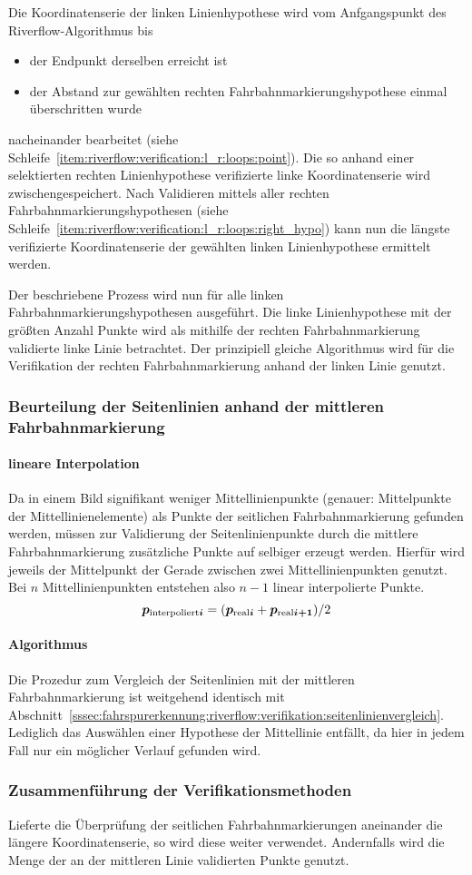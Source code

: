 Die Koordinatenserie der linken Linienhypothese wird vom Anfgangspunkt des Riverflow-Algorithmus bis
\begin{itemize}
\item der Endpunkt derselben erreicht ist 
\item der Abstand zur gewählten rechten Fahrbahnmarkierungshypothese einmal überschritten wurde
\end{itemize}
nacheinander bearbeitet (siehe Schleife~\ref{item:riverflow:verification:l_r:loops:point}). Die so anhand einer selektierten rechten Linienhypothese verifizierte linke Koordinatenserie wird zwischengespeichert. 
Nach Validieren mittels aller rechten Fahrbahnmarkierungshypothesen (siehe Schleife~\ref{item:riverflow:verification:l_r:loops:right_hypo}) kann nun die längste verifizierte Koordinatenserie der gewählten linken Linienhypothese ermittelt werden.

Der beschriebene Prozess wird nun für alle linken Fahrbahnmarkierungshypothesen ausgeführt. Die linke Linienhypothese mit der größten Anzahl Punkte wird als mithilfe der rechten Fahrbahnmarkierung validierte linke Linie betrachtet. Der prinzipiell gleiche Algorithmus wird für die Verifikation der rechten Fahrbahnmarkierung anhand der linken Linie genutzt.

\subsubsection{Beurteilung der Seitenlinien anhand der mittleren Fahrbahnmarkierung}
\paragraph{lineare Interpolation}
Da in einem Bild signifikant weniger Mittellinienpunkte (genauer: Mittelpunkte der Mittellinienelemente) als Punkte der seitlichen Fahrbahnmarkierung gefunden werden, müssen zur Validierung der Seitenlinienpunkte durch die mittlere Fahrbahnmarkierung zusätzliche Punkte auf selbiger erzeugt werden. Hierfür wird jeweils der Mittelpunkt der Gerade zwischen zwei Mittellinienpunkten genutzt. Bei \( n \) Mittellinienpunkten entstehen also \( n-1 \) linear interpolierte Punkte.
\begin{equation}
\boldsymbol{p_{\text{interpoliert}i}} = (\boldsymbol{p_{\text{real}i}}+\boldsymbol{p_{\text{real}i+1}})/2 
\end{equation}
\paragraph{Algorithmus} Die Prozedur zum Vergleich der Seitenlinien mit der mittleren Fahrbahnmarkierung ist weitgehend identisch mit Abschnitt~\ref{sssec:fahrspurerkennung:riverflow:verifikation:seitenlinienvergleich}. Lediglich das Auswählen einer Hypothese der Mittellinie entfällt, da hier in jedem Fall nur ein möglicher Verlauf gefunden wird.

\subsubsection{Zusammenführung der Verifikationsmethoden}
Lieferte die Überprüfung der seitlichen Fahrbahnmarkierungen aneinander die längere Koordinatenserie, so wird diese weiter verwendet. Andernfalls wird die Menge der an der mittleren Linie validierten Punkte genutzt.